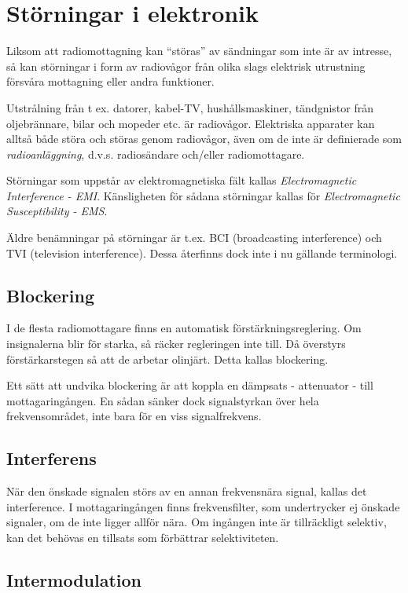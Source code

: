 \section{Störningar i elektronik}

Liksom att radiomottagning kan ``störas'' av sändningar som inte är av
intresse, så kan störningar i form av radiovågor från olika slags
elektrisk utrustning försvåra mottagning eller andra funktioner.

Utstrålning från t ex. datorer, kabel-TV, hushållsmaskiner,
tändgnistor från oljebrännare, bilar och mopeder etc. är radiovågor.
Elektriska apparater kan alltså både störa och störas genom
radiovågor, även om de inte är definierade som \emph{radioanläggning},
d.v.s. radiosändare och/eller radiomottagare.

Störningar som uppstår av elektromagnetiska fält kallas
\emph{Electromagnetic Interference - EMI}. Känsligheten för sådana
störningar kallas för \emph{Electromagnetic Susceptibility - EMS}.

Äldre benämningar på störningar är t.ex. BCI (broadcasting
interference) och TVI (television interference). Dessa återfinns dock
inte i nu gällande terminologi.

\subsection{Blockering}
I de flesta radiomottagare finns en automatisk
förstärkningsreglering. Om insignalerna blir för starka, så räcker
regleringen inte till.  Då överstyrs förstärkarstegen så att de
arbetar olinjärt. Detta kallas blockering.

Ett sätt att undvika blockering är att koppla en dämpsats -
attenuator - till mottagaringången. En sådan sänker dock signalstyrkan
över hela frekvensområdet, inte bara för en viss signalfrekvens.

\subsection{Interferens}

När den önskade signalen störs av en annan frekvensnära signal, kallas
det interference. I mottagaringången finns frekvensfilter, som
undertrycker ej önskade signaler, om de inte ligger allför nära. Om
ingången inte är tillräckligt selektiv, kan det behövas en tillsats
som förbättrar selektiviteten.

\subsection{Intermodulation}

